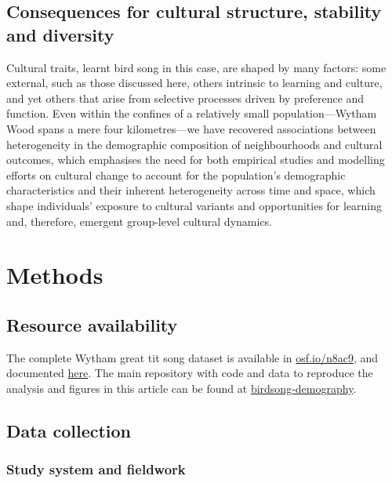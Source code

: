\documentclass[9pt, twocolumn, twoside]{gsajnl}
\begin{document}
\subsection{Consequences for cultural structure, stability and diversity}

Cultural traits, learnt bird song in this case, are shaped by many factors: some external, such as those discussed here, others intrinsic to learning and culture, and yet others that arise from selective processes driven by preference and function. Even within the confines of a relatively small population---Wytham Wood spans a mere four kilometres---we have recovered associations between heterogeneity in the demographic composition of neighbourhoods and cultural outcomes, which emphasises the need for both empirical studies and modelling efforts on cultural change to account for the population's demographic characteristics and their inherent heterogeneity across time and space, which shape individuals' exposure to cultural variants and opportunities for learning and, therefore, emergent group-level cultural dynamics.

\section{Methods}

\subsection{Resource availability}

The complete Wytham great tit song dataset is available in \href{https://osf.io/n8ac9}{osf.io/n8ac9}, and documented \href{https://nilomr.github.io/great-tit-hits/}{here}. The main repository with code and data to reproduce the analysis and figures in this article can be found at \href{http://github.com/nilomr/birdsong-demography}{birdsong-demography}.

\subsection{Data collection}

\subsubsection{Study system and fieldwork}
\end{document}
